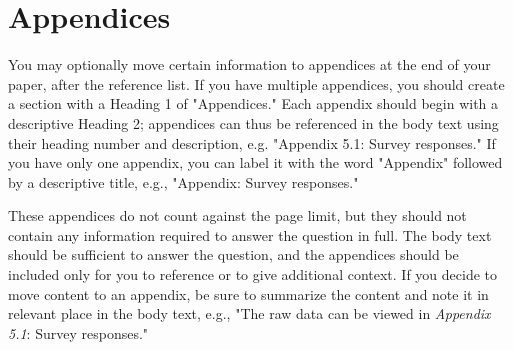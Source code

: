 \documentclass[11pt,a4paper,usenames,dvipsnames]{article}
\begin{document}
%
%
%
\printbibliography
\section{Appendices}
You may optionally move certain information to appendices at the end of your paper, after the reference list. If you have multiple appendices, you should create a section with a Heading 1 of "Appendices." Each appendix should begin with a descriptive Heading 2; appendices can thus be referenced in the body text using their heading number and description, e.g. "Appendix 5.1: Survey responses." If you have only one appendix, you can label it with the word "Appendix" followed by a descriptive title, e.g., "Appendix: Survey responses."

These appendices do not count against the page limit, but they should not contain any information required to answer the question in full. The body text should be sufficient to answer the question, and the appendices should be included only for you to reference or to give additional context. If you decide to move content to an appendix, be sure to summarize the content and note it in relevant place in the body text, e.g., "The raw data can be viewed in \textit{Appendix 5.1}: Survey responses."
\end{document}
